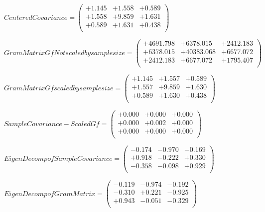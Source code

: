 \documentclass[9pt]{article}
\theoremstyle{plain}
\theoremstyle{definition}
\theoremstyle{remark}
\numberwithin{equation}{section}
\begin{document}
$Centered Covariance = \left(
\begin{array}{
ccc}
+1.145 & +1.558 & +0.589 \\
+1.558 & +9.859 & +1.631 \\
+0.589 & +1.631 & +0.438 \\
\end{array}
\right)$ \newline 

$Gram Matrix Gf Not scaled by sample size = \left(
\begin{array}{
ccc}
+4691.798 & +6378.015 & +2412.183 \\
+6378.015 & +40383.068 & +6677.072 \\
+2412.183 & +6677.072 & +1795.407 \\
\end{array}
\right)$ \newline 

$Gram Matrix Gf  scaled by sample size = \left(
\begin{array}{
ccc}
+1.145 & +1.557 & +0.589 \\
+1.557 & +9.859 & +1.630 \\
+0.589 & +1.630 & +0.438 \\
\end{array}
\right)$ \newline 

$SampleCovariance - Scaled Gf = \left(
\begin{array}{
ccc}
+0.000 & +0.000 & +0.000 \\
+0.000 & +0.002 & +0.000 \\
+0.000 & +0.000 & +0.000 \\
\end{array}
\right)$ \newline 

$EigenDecomp of SampleCovariance = \left(
\begin{array}{
ccc}
-0.174 & -0.970 & -0.169 \\
+0.918 & -0.222 & +0.330 \\
-0.358 & -0.098 & +0.929 \\
\end{array}
\right)$ \newline 

$EigenDecomp of Gram Matrix = \left(
\begin{array}{
ccc}
-0.119 & -0.974 & -0.192 \\
-0.310 & +0.221 & -0.925 \\
+0.943 & -0.051 & -0.329 \\
\end{array}
\right)$ \newline 
\end{document}
